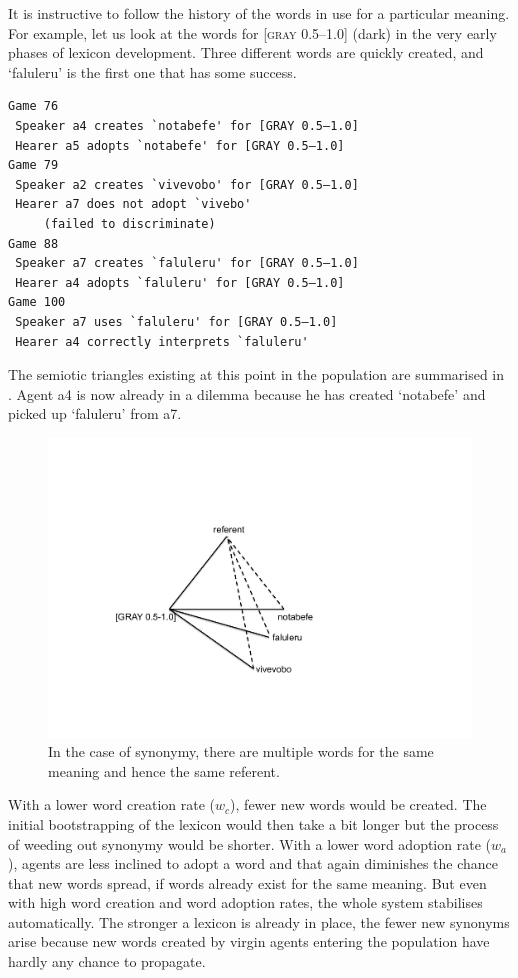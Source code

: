 It is instructive to follow the history of the words 
in use for a particular meaning. For 
example, let us look at the words for [\textsc{gray} 0.5–1.0] 
(dark) in the very early phases of lexicon development.
Three different words are quickly created, and 
`faluleru' is the first one that has some success. 
\begin{verbatim}
Game 76
 Speaker a4 creates `notabefe' for [GRAY 0.5–1.0]
 Hearer a5 adopts `notabefe' for [GRAY 0.5–1.0]
Game 79 
 Speaker a2 creates `vivevobo' for [GRAY 0.5–1.0]
 Hearer a7 does not adopt `vivebo' 
     (failed to discriminate)
Game 88 
 Speaker a7 creates `faluleru' for [GRAY 0.5–1.0]
 Hearer a4 adopts `faluleru' for [GRAY 0.5–1.0]
Game 100 
 Speaker a7 uses `faluleru' for [GRAY 0.5–1.0]
 Hearer a4 correctly interprets `faluleru'
\end{verbatim}
The semiotic triangles existing at this point in the population are 
summarised in . 
Agent {\bfshape  a4} is now already in a dilemma because he has created
`notabefe' and picked up `faluleru' from {\bfshape  a7}. 


\begin{figure}[htbp]
  \centerline{\includegraphics[width=.50\textwidth]{chap6/figs/triangle6.pdf}}
\caption{\label{triangle6}In the case of synonymy, 
there are multiple words for the same meaning and hence the 
same referent.}
\end{figure}

With a lower word creation rate ($w_{c}$), 
fewer new words would be created. The initial bootstrapping
of the lexicon would then take a bit longer but the 
process of weeding out synonymy would be shorter. 
With a lower word adoption rate ($w_{a}$), agents are
less inclined to adopt a word and that again diminishes
the chance that new words spread, if words already 
exist for the same meaning. But even with high word creation
and word adoption rates, the whole system stabilises automatically. 
The stronger a lexicon is already in place, the fewer
new synonyms arise because new words
created by virgin agents entering the population have hardly 
any chance to propagate. 

